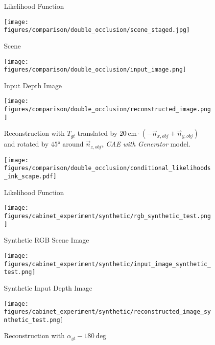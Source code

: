 \documentclass[letterpaper, 10 pt, journal, twoside]{ieeetran}  %
\begin{document}
\begin{figure*}[htp]
\begin{subfigure}[t]{0.245\textwidth}
		\caption{Likelihood Function}
		\label{fig:exp_b_conditional_likelihood_cae}
	\end{subfigure}
	\hfill
	\begin{subfigure}[t]{0.245\textwidth}
		\texttt{[image: figures/comparison/double\_occlusion/scene\_staged.jpg]}
		\caption{Scene}
		\label{fig:exp_c_scene}
	\end{subfigure}
	\hfill
	\begin{subfigure}[t]{0.245\textwidth}
		\texttt{[image: figures/comparison/double\_occlusion/input\_image.png]}
		\caption{Input Depth Image}
		\label{fig:exp_c_input}
	\end{subfigure}
	\hfill
	\begin{subfigure}[t]{0.245\textwidth}
		\texttt{[image: figures/comparison/double\_occlusion/reconstructed\_image.png]}
		\caption{Reconstruction with $T_{gt}$ translated by $\SI{20}{\centi\meter} \cdot (-\vec{n}_{x, obj} + \vec{n}_{y, obj})$ and rotated by $\ang{45}$ around $\vec{n}_{z, obj}$, \textit{CAE with Generator} model.}
		\label{fig:exp_c_reconstruction}
	\end{subfigure}
	\hfill
 	\begin{subfigure}[t]{0.245\textwidth}
 		\texttt{[image: figures/comparison/double\_occlusion/conditional\_likelihoods\_ink\_scape.pdf]}
 		\caption{Likelihood Function}
 		\label{fig:exp_c_conditional_likelihood_cae}
 	\end{subfigure}
	\begin{subfigure}[t]{0.245\textwidth}
		\texttt{[image: figures/cabinet\_experiment/synthetic/rgb\_synthetic\_test.png]}
		\caption{Synthetic RGB Scene Image}
		\label{fig:cabinet_exp_synthetic_scene}
	\end{subfigure}
	\hfill
	\begin{subfigure}[t]{0.245\textwidth}
		\texttt{[image: figures/cabinet\_experiment/synthetic/input\_image\_synthetic\_test.png]}
		\caption{Synthetic Input Depth Image}
		\label{fig:cabinet_exp_synthetic_input_image}
	\end{subfigure}
	\hfill
	\begin{subfigure}[t]{0.245\textwidth}
		\texttt{[image: figures/cabinet\_experiment/synthetic/reconstructed\_image\_synthetic\_test.png]}
		\caption{Reconstruction with $\alpha_{gt} - 180 \ \textrm{deg}$}
		\label{fig:cabinet_exp_synthetic_reconstruction}
	\end{subfigure}
	\hfill
	\begin{subfigure}[t]{0.245\textwidth}

\end{subfigure}
\end{figure*}
\end{document}
